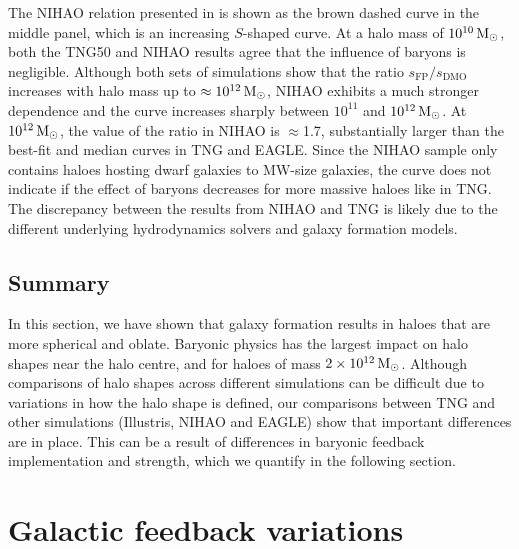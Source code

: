 \documentclass[fleqn,usenatbib]{mnras}
\def\msun{\,\rm M_{\odot}}
\begin{document}
The NIHAO relation presented  in \cite{Butsky16v462} is shown as the brown dashed curve in the middle panel, which is an increasing $S$-shaped curve.
At a halo mass of $10^{10} \msun$, both the TNG50 and NIHAO results agree that the influence of baryons is negligible.
Although both sets of simulations show that the ratio $s_\text{FP}/s_\text{DMO}$ increases with halo mass up to $\approx 10^{12} \msun$,
NIHAO exhibits a much stronger dependence and the curve increases sharply between $10^{11}$ and $10^{12} \msun$.
At $10^{12} \msun$, the value of the  ratio in NIHAO is ${\approx}$1.7, substantially larger than the best-fit and median curves in TNG and EAGLE.
Since the NIHAO sample only contains haloes hosting dwarf galaxies to MW-size galaxies, the curve does not indicate if the effect of baryons decreases for more massive haloes like in TNG.
The discrepancy between the results from NIHAO and TNG is likely due to the different underlying hydrodynamics solvers and galaxy formation models.


\subsection{Summary}

In this section, we have shown that galaxy formation results in haloes that are more spherical and oblate.
Baryonic physics has the largest impact on halo shapes near the halo centre, and for haloes of mass $2 \times 10^{12} \msun$.
Although comparisons of halo shapes across different simulations can be difficult due to variations in how the halo shape is defined, our comparisons between TNG and other simulations (Illustris, NIHAO and EAGLE) show that important differences are in place.
This can be a result of differences in baryonic feedback implementation and strength, which we quantify in the following section.







\section{Galactic feedback variations}
\label{sec:variations}
\end{document}

